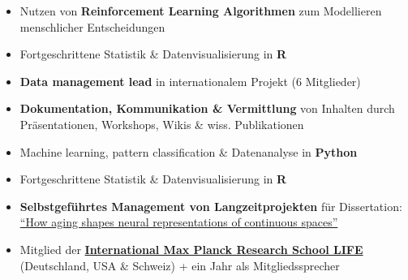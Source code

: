 \documentclass[10pt,a4paper,ragged2e,withhyper]{altacv}
\begin{document}
\begin{paracol}{2}
  \begin{itemize}[itemsep=4pt]
    \item Nutzen von \textbf{Reinforcement Learning Algorithmen} zum Modellieren menschlicher Entscheidungen
    \item Fortgeschrittene Statistik \& Datenvisualisierung in \textbf{R}
    \item \textbf{Data management lead} in internationalem Projekt (6 Mitglieder)
    \item \textbf{Dokumentation, Kommunikation \& Vermittlung} von Inhalten durch Präsentationen, Workshops, Wikis \& wiss. Publikationen

  \end{itemize}
  
  \divider{}
  
  \begin{itemize}[itemsep=4pt]
    \item Machine learning, pattern classification \& Datenanalyse in \textbf{Python}
     \item Fortgeschrittene Statistik \& Datenvisualisierung in \textbf{R}
    \item \textbf{Selbstgeführtes Management von Langzeitprojekten} für Dissertation: \href{http://dx.doi.org/10.17169/refubium-39372}{``How aging shapes neural representations of continuous spaces''}
    \item Mitglied der \href{https://www.imprs-life.mpg.de/}{\textbf{International Max Planck Research School LIFE}} (Deutschland, USA \& Schweiz) + ein Jahr als Mitgliedssprecher
  \end{itemize}


\end{paracol}
\end{document}
